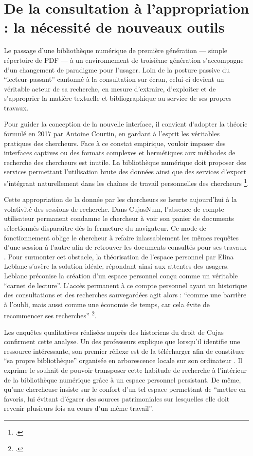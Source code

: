 \section[De la consultation à l'appropriation]{De la consultation à l'appropriation : la nécessité de nouveaux outils}
Le passage d'une bibliothèque numérique de première génération — simple répertoire de \ac{PDF} — à un environnement de troisième génération s'accompagne d'un changement de paradigme pour l'usager. Loin de la posture passive du \enquote{lecteur-passant} cantonné à la consultation sur écran, celui-ci devient un véritable acteur de sa recherche, en mesure d'extraire, d'exploiter et de s'approprier la matière textuelle et bibliographique au service de ses propres travaux.

Pour guider la conception de la nouvelle interface, il convient d'adopter la théorie formulé en 2017 par Antoine Courtin, en gardant à l'esprit les véritables pratiques des chercheurs. Face à ce constat empirique, vouloir imposer des interfaces captives ou des formats complexes et hermétiques aux méthodes de recherche des chercheurs est inutile. La bibliothèque numérique doit proposer des services permettant l'utilisation brute des données ainsi que des services d'export s'intégrant naturellement dans les chaînes de travail personnelles des chercheurs \footcite{lavennedelamontoiseOAIPMHPMHLheure2020}.

Cette appropriation de la donnée par les chercheurs se heurte aujourd'hui à la volativité des sessions de recherche. Dans CujasNum, l'absence de compte utilisateur permanent condamne le chercheur à voir son panier de documents sélectionnés disparaître dès la fermeture du navigateur. Ce mode de fonctionnement oblige le chercheur à refaire inlassablement les mêmes requêtes d'une session à l'autre afin de retrouver les documents consultés pour ses travaux . Pour surmonter cet obstacle, la théorisation de l'espace personnel par Elina Leblanc s'avère la solution idéale, répondant ainsi aux attentes des usagers. Leblanc préconise la  création d'un espace personnel conçu comme un véritable \enquote{carnet de lecture}. L'accès permanent à ce compte personnel ayant un historique des consultations et des recherches sauvegardées agit alors : \enquote{comme une barrière à l'oubli, mais aussi comme une économie de temps, car cela évite de recommencer ses recherches} \footcite{leblancBibliothequesNumeriquesEnrichies}. 

Les enquêtes qualitatives réalisées auprès des historiens du droit de Cujas confirment cette analyse. Un des professeurs explique que lorsqu'il identifie une ressource intéressante, son premier réflexe est de la télécharger afin de constituer \enquote{sa propre bibliothèque} organisée en arborescence locale sur son ordinateur . Il exprime le souhait de pouvoir transposer cette habitude de recherche à l'intérieur de la bibliothèque numérique grâce à un espace personnel persistant. De même, qu'une chercheuse insiste sur le confort d'un tel espace permettant de \enquote{mettre en favoris, lui évitant d'égarer des sources patrimoniales sur lesquelles elle doit revenir plusieurs fois au cours d'un même travail}.


